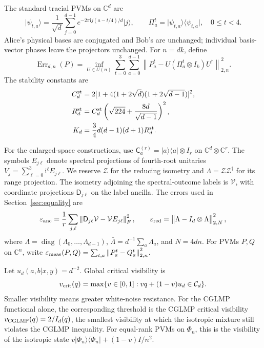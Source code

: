 \documentclass[11pt]{amsart}
\theoremstyle{remark}
\theoremstyle{plain}
\numberwithin{equation}{section}
\DeclareMathOperator{\diag}{diag}
\DeclareMathOperator{\Err}{Err}
\newcommand{\C}{\mathbb C}
\newcommand{\ii}{\mathrm i}
\newcommand{\Loc}{\mathcal C}
\newcommand{\ket}[1]{\lvert#1\rangle}
\newcommand{\bra}[1]{\langle#1\rvert}
\newcommand{\norm}[1]{\left\|#1\right\|}
\newcommand{\Comp}[1]{\mathsf C^{(#1)}}
\newcommand{\epsanc}{\varepsilon_{\rm anc}}
\newcommand{\epsred}{\varepsilon_{\rm red}}
\newcommand{\epsmeas}{\varepsilon_{\rm meas}}
\begin{document}
The standard tracial PVMs on \(\C^d\) are
\begin{equation}\label{eq:standard}
 \ket{\psi_{t,a}}=\frac1{\sqrt d}\sum_{j=0}^{d-1}
 e^{-2\pi\ii j(a-t/4)/d}\ket j,\qquad
 \Pi^t_a=\ket{\psi_{t,a}}\bra{\psi_{t,a}},
 \quad 0\le t<4.
\end{equation}
Alice's physical bases are conjugated and Bob's are unchanged;
individual basis-vector phases leave the projectors unchanged.
For \(n=dk\), define
\begin{equation}\label{eq:distance}
 \Err_{d,n}(P)=\inf_{U\in U(n)}
 \sum_{t=0}^3\sum_{a=0}^{d-1}
 \norm{P^t_a-U(\Pi^t_a\otimes I_k)U^\dagger}_{2,n}^2.
\end{equation}
The stability constants are
\begin{equation}\label{eq:stabilityconstants}
 \begin{split}
 C_d^{\rm st}
 &=2[1+4(1+2\sqrt d)(1+2\sqrt{d-1})]^2,\\
 R_d^{\rm st}
 &=C_d^{\rm st}
       \left(\sqrt{224}+\frac{8d}{\sqrt{d-1}}\right)^2,\\
 K_d&=\frac34d(d-1)(d+1)R_d^{\rm st}.
 \end{split}
\end{equation}

For the enlarged-space constructions, use
\(\Comp{r}_a=\ket a\bra a\otimes I_r\) on \(\C^d\otimes\C^r\).
The symbols \(E_{j\ell}\) denote spectral projections of fourth-root
unitaries \(V_j=\sum_{\ell=0}^3\ii^\ell E_{j\ell}\).
We reserve \(\mathcal Z\) for the reducing isometry and
\(\Lambda=\mathcal Z\mathcal Z^\dagger\) for its range projection.
The isometry adjoining the spectral-outcome labels is \(\mathcal V\),
with coordinate projections \(\mathsf D_{j\ell}\) on the label
ancilla. The errors used in Section~\ref{sec:equality} are
\[
 \epsanc=\frac1r\sum_{j,\ell}
       \norm{\mathsf D_{j\ell}\mathcal V-\mathcal V E_{j\ell}}_F^2,
 \qquad
 \epsred=\norm{\Lambda-I_d\otimes\bar\Lambda}_{2,N}^2,
\]
where \(\Lambda=\diag(\Lambda_0,\ldots,\Lambda_{d-1})\),
\(\bar\Lambda=d^{-1}\sum_a\Lambda_a\), and \(N=4dn\).
For PVMs \(P,Q\) on \(\C^n\), write
\(\epsmeas(P,Q)=\sum_{t,a}\norm{P^t_a-Q^t_a}_{2,n}^2\).

Let \(u_d(a,b|x,y)=d^{-2}\). Global critical visibility is
\[
 v_{\rm crit}(q)=
 \max\{v\in[0,1]:vq+(1-v)u_d\in\Loc_d\}.
\]
Smaller visibility means greater white-noise resistance.
For the CGLMP functional alone, the corresponding threshold is the
CGLMP critical visibility \(v_{\rm CGLMP}(q)=2/I_d(q)\), the smallest
visibility at which the isotropic mixture still violates the CGLMP
inequality.
For equal-rank PVMs on \(\Phi_n\), this is the visibility of the
isotropic state
\(v\ket{\Phi_n}\bra{\Phi_n}+(1-v)I/n^2\).
\end{document}

